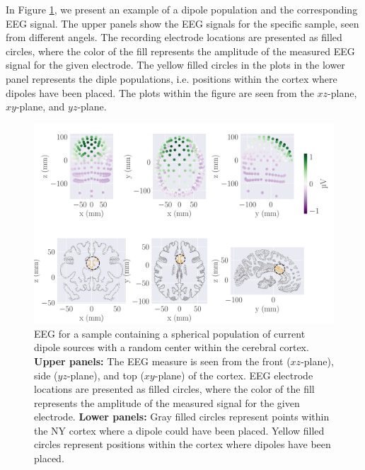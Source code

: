 \documentclass[a4paper, UKenglish, 11pt]{uiomaster}
\begin{document}
In Figure \ref{fig:dipole_area}, we present an example of a dipole population and the corresponding EEG signal. The upper panels show the EEG signals for the specific sample, seen from different angels. The recording electrode locations are presented as filled circles, where the color of the fill represents the amplitude of the measured EEG signal for the given electrode. The yellow filled circles in the plots in the lower panel represents the diple populations, i.e. positions within the cortex where dipoles have been placed. The plots within the figure are seen from the $xz$-plane, $xy$-plane, and $yz$-plane.

\begin{figure}[!htb]
\centering
\includegraphics[width=\linewidth]{figures/purple_green/dipole_area_reduced_0.pdf}
\caption{EEG for a sample containing a spherical population of current dipole sources with a random center within the cerebral cortex.
\textbf{Upper panels:}
The EEG measure is seen from the front ($xz$-plane), side ($yz$-plane), and top ($xy$-plane) of the cortex. EEG electrode locations are presented as filled circles, where the color of the fill represents the amplitude of the measured signal for the given electrode.
\textbf{Lower panels:}
Gray filled circles represent points within the NY cortex where a dipole could have been placed. Yellow filled circles represent positions within the cortex where dipoles have been placed.}
\label{fig:dipole_area}
\end{figure}

\end{document}
